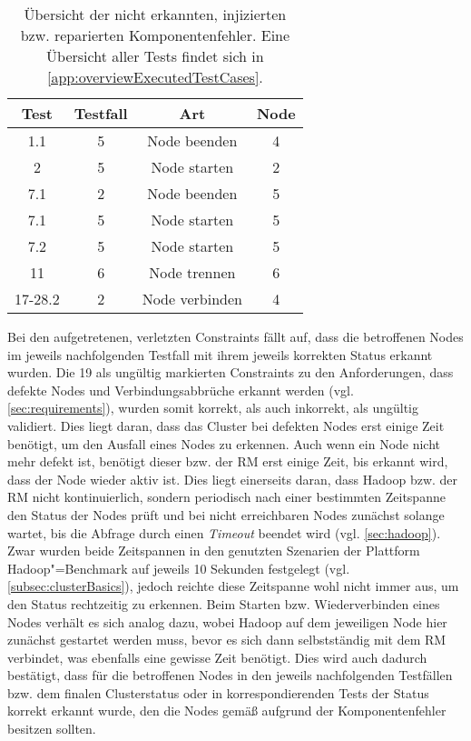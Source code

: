 \begin{table}[h]
    \begin{tabular}{c|ccc}
    	 \gls{Test}   & \gls{Testfall} &      Art       & Node \\ \hline
    	  1.1   &    5     &  Node beenden  &  4   \\
    	   2    &    5     &  Node starten  &  2   \\
    	  7.1   &    2     &  Node beenden  &  5   \\
    	  7.1   &    5     &  Node starten  &  5   \\
    	  7.2   &    5     &  Node starten  &  5   \\
    	  11    &    6     &  Node trennen  &  6   \\
    	17-28.2 &    2     & Node verbinden &  4
    \end{tabular} 
    \caption[Übersicht der nicht erkannten, injizierten/reparierten Komponentenfehler]
    {Übersicht der nicht erkannten, injizierten bzw. reparierten Komponentenfehler.
    Eine Übersicht aller Tests findet sich in \cref{app:overviewExecutedTestCases}.}
    \label{tab:notDetectedFaults}
\end{table}

Bei den aufgetretenen, verletzten Constraints fällt auf, dass die betroffenen Nodes im jeweils nachfolgenden \gls{Testfall} mit ihrem jeweils korrekten Status erkannt wurden.
Die 19 als ungültig markierten Constraints zu den Anforderungen, dass defekte Nodes und Verbindungsabbrüche erkannt werden (vgl. \cref{sec:requirements}), wurden somit korrekt, als auch inkorrekt, als ungültig validiert.
Dies liegt daran, dass das Cluster bei defekten Nodes erst einige Zeit benötigt, um den Ausfall eines Nodes zu erkennen.
Auch wenn ein Node nicht mehr defekt ist, benötigt dieser bzw. der \gls{RM} erst einige Zeit, bis erkannt wird, dass der Node wieder aktiv ist.
Dies liegt einerseits daran, dass Hadoop bzw. der \gls{RM} nicht kontinuierlich, sondern periodisch nach einer bestimmten Zeitspanne den Status der Nodes prüft und bei nicht erreichbaren Nodes zunächst solange wartet, bis die Abfrage durch einen \emph{Timeout} beendet wird (vgl. \cref{sec:hadoop}).
Zwar wurden beide Zeitspannen in den genutzten Szenarien der Plattform Hadoop"=Benchmark auf jeweils 10 Sekunden festgelegt (vgl. \cref{subsec:clusterBasics}), jedoch reichte diese Zeitspanne wohl nicht immer aus, um den Status rechtzeitig zu erkennen.
Beim Starten bzw. Wiederverbinden eines Nodes verhält es sich analog dazu, wobei Hadoop auf dem jeweiligen Node hier zunächst gestartet werden muss, bevor es sich dann selbstständig mit dem \gls{RM} verbindet, was ebenfalls eine gewisse Zeit benötigt.
Dies wird auch dadurch bestätigt, dass für die betroffenen Nodes in den jeweils nachfolgenden Testfällen bzw. dem finalen Clusterstatus oder in korrespondierenden \glspl{Test} der Status korrekt erkannt wurde, den die Nodes gemäß aufgrund der Komponentenfehler besitzen sollten.

